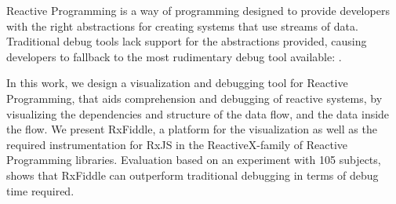 Reactive Programming is a way of programming designed to provide
developers with the right abstractions for creating systems that use
streams of data.  Traditional debug tools lack support for the
abstractions provided, causing developers to fallback to the most
rudimentary debug tool available:  \printfdebugging{}.

In this work, we design a visualization and debugging tool for Reactive
Programming, that aids comprehension and debugging of reactive systems,
by visualizing the dependencies and structure of the data flow, and the
data inside the flow.  We present RxFiddle, a platform for the
visualization as well as the required instrumentation for RxJS in the
ReactiveX-family of Reactive Programming libraries.  Evaluation based on
an experiment with 105 subjects, shows that RxFiddle can outperform
traditional debugging in terms of debug time required.
